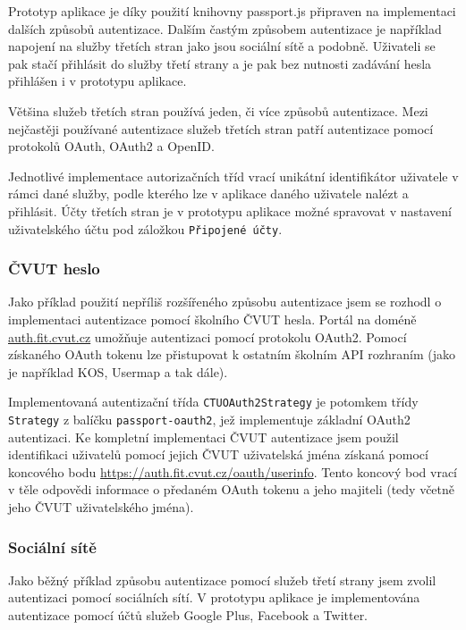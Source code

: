 Prototyp aplikace je díky použití knihovny passport.js připraven na implementaci dalších způsobů autentizace.
Dalším častým způsobem autentizace je například napojení na služby třetích stran jako jsou sociální sítě a podobně.
Uživateli se pak stačí přihlásit do služby třetí strany a je pak bez nutnosti zadávání hesla přihlášen i v prototypu aplikace.

Většina služeb třetích stran používá jeden, či více způsobů autentizace.
Mezi nejčastěji používané autentizace služeb třetích stran patří autentizace pomocí protokolů OAuth, OAuth2 a OpenID.

Jednotlivé implementace autorizačních tříd vrací unikátní identifikátor uživatele v rámci dané služby, podle kterého lze v aplikace daného uživatele nalézt a přihlásit.
Účty třetích stran je v prototypu aplikace možné spravovat v nastavení uživatelského účtu pod záložkou \texttt{Připojené účty}.

\subsubsection{ČVUT heslo}

Jako příklad použití nepříliš rozšířeného způsobu autentizace jsem se rozhodl o implementaci autentizace pomocí školního \acrshort{ČVUT} hesla.
Portál na doméně \href{https://auth.fit.cvut.cz/manager}{auth.fit.cvut.cz} umožňuje autentizaci pomocí protokolu OAuth2.
Pomocí získaného OAuth tokenu lze přistupovat k ostatním školním \gls{API} rozhraním (jako je například KOS, Usermap a tak dále).

Implementovaná autentizační třída \texttt{CTUOAuth2Strategy} je potomkem třídy \texttt{Strategy} z balíčku \texttt{passport-oauth2}, jež implementuje základní OAuth2 autentizaci.
Ke kompletní implementaci \acrshort{ČVUT} autentizace jsem použil identifikaci uživatelů pomocí jejich \acrshort{ČVUT} uživatelská jména získaná pomocí koncového bodu \url{https://auth.fit.cvut.cz/oauth/userinfo}.
Tento koncový bod vrací v těle odpovědi informace o předaném OAuth tokenu a jeho majiteli (tedy včetně jeho \acrshort{ČVUT} uživatelského jména).

\subsubsection{Sociální sítě}

Jako běžný příklad způsobu autentizace pomocí služeb třetí strany jsem zvolil autentizaci pomocí sociálních sítí.
V prototypu aplikace je implementována autentizace pomocí účtů služeb Google Plus, Facebook a Twitter.

